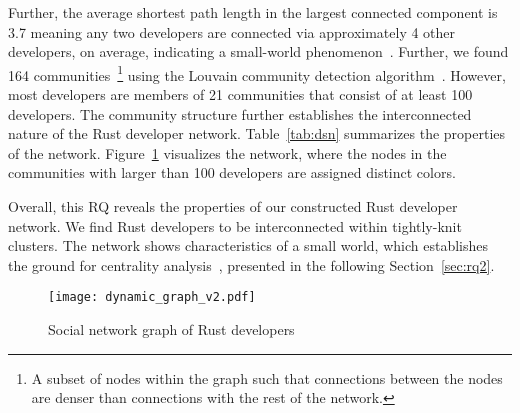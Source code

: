\documentclass[10pt,journal,compsoc]{IEEEtran}
\begin{document}
Further, the average shortest path length in the largest connected component is 3.7 meaning any two developers are connected via approximately 4 other developers, on average, indicating a small-world phenomenon~\cite{walsh1999search, sherchan2013survey}. 
Further, we found 164 communities~\footnote{A subset of nodes within the graph such that connections between the nodes are denser than connections with the rest of the network.} using the Louvain community detection algorithm~\cite{que2015scalable}. However, most developers are members of 21 communities that consist of at least 100 developers. The community structure further establishes the interconnected nature of the Rust developer network. Table~\ref{tab:dsn} summarizes the properties of the network. 
Figure~\ref{fig:dsn} visualizes the network, where the nodes in the communities with larger than 100 developers are assigned distinct colors. 

Overall, this RQ reveals the properties of our constructed Rust developer network. We find Rust developers to be interconnected within tightly-knit clusters. The network shows characteristics of a small world, which establishes the ground for centrality analysis~\cite{watts1998collective, wasserman1994social}, presented in the following Section~\ref{sec:rq2}. 

\begin{figure}
    \centering
    \texttt{[image: dynamic\_graph\_v2.pdf]}
    \caption{Social network graph of Rust developers}
    \label{fig:dsn}
\end{figure}


\end{document}
